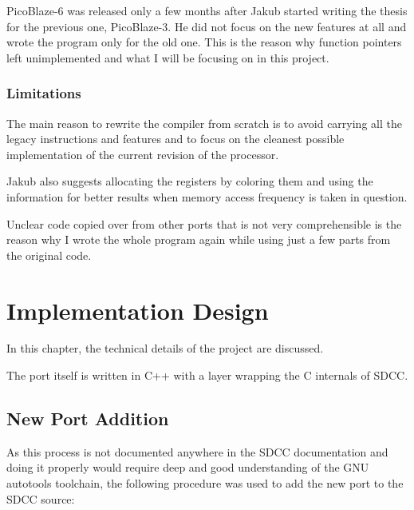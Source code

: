         PicoBlaze-6 was released only a few months after Jakub started writing the thesis for the previous one, PicoBlaze-3. 
        He did not focus on the new features at all and wrote the program only for the old one.
        This is the reason why function pointers left unimplemented and what I will be focusing on in this project.

        \subsection{Limitations}

        The main reason to rewrite the compiler from scratch is to avoid carrying all the legacy instructions and features and to focus on the cleanest possible implementation of the current revision of the processor.

        Jakub also suggests allocating the registers by coloring them and using the information for better results when memory access frequency is taken in question.

        Unclear code copied over from other ports that is not very comprehensible is the reason why I wrote the whole program again while using just a few parts from the original code.

\chapter{Implementation Design}\label{design}

In this chapter, the technical details of the project are discussed.

The port itself is written in C++ with a layer wrapping the C internals of SDCC.

    \section{New Port Addition}

        As this process is not documented anywhere in the SDCC documentation and doing it properly would require deep and good understanding of the GNU autotools toolchain, the following procedure was used to add the new port to the SDCC source:

